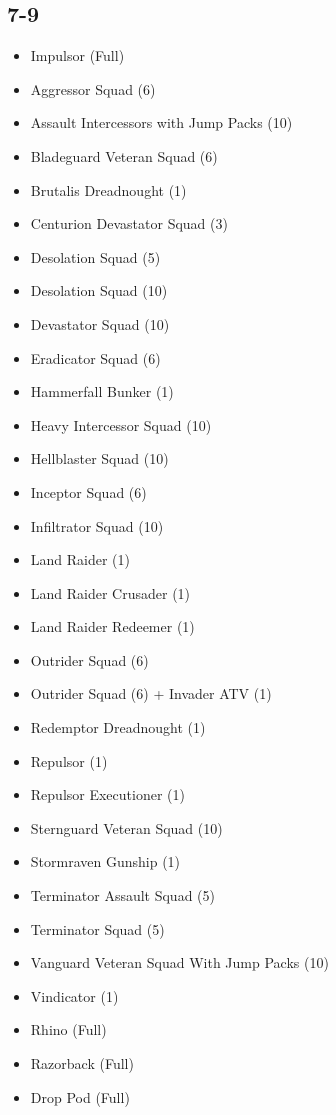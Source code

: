 \documentclass{HordeModeTarot}
\begin{document}
\begin{multicols}{2}
\subsection*{7-9}

\begin{itemize}[leftmargin=*]
\item[] Impulsor (Full)
\item[] Aggressor Squad (6)
\item[] Assault Intercessors with Jump Packs (10)
\item[] Bladeguard Veteran Squad (6)
\item[] Brutalis Dreadnought (1)
\item[] Centurion Devastator Squad (3)
\item[] Desolation Squad (5)
\item[] Desolation Squad (10)
\item[] Devastator Squad (10)
\item[] Eradicator Squad (6)
\item[] Hammerfall Bunker (1)
\item[] Heavy Intercessor Squad (10)
\item[] Hellblaster Squad (10)
\item[] Inceptor Squad (6)
\item[] Infiltrator Squad (10)
\item[] Land Raider (1)
\item[] Land Raider Crusader (1)
\item[] Land Raider Redeemer (1)
\item[] Outrider Squad (6)
\item[] Outrider Squad (6) + Invader ATV (1)
\item[] Redemptor Dreadnought (1)
\item[] Repulsor (1)
\item[] Repulsor Executioner (1)
\item[] Sternguard Veteran Squad (10)
\item[] Stormraven Gunship (1)
\item[] Terminator Assault Squad (5)
\item[] Terminator Squad (5)
\item[] Vanguard Veteran Squad With Jump Packs (10)
\item[] Vindicator (1)
\item[] Rhino (Full)
\item[] Razorback (Full)
\item[] Drop Pod (Full)
\end{itemize}


\end{multicols}
\end{document}
